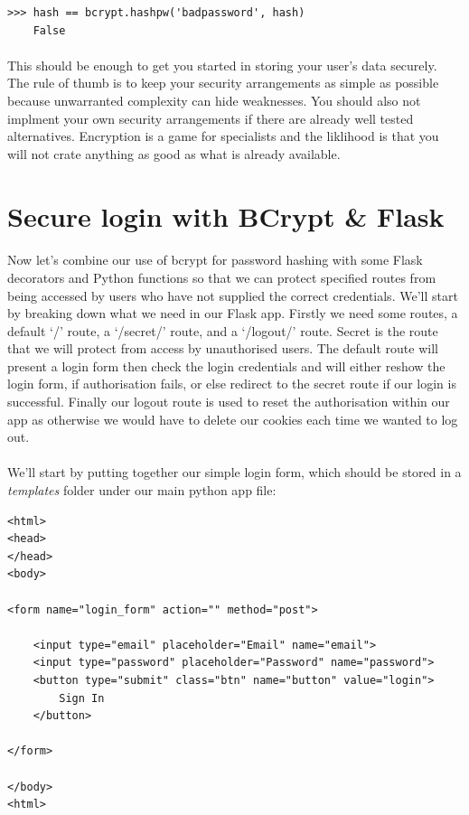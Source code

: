 \documentclass[12pt, a4paper, oneside]{book}
\begin{document}
\begin{lstlisting}[style=DOS]
    >>> hash == bcrypt.hashpw('badpassword', hash)
    False
\end{lstlisting}

\paragraph{} This should be enough to get you started in storing your user's data securely. The rule of thumb is to keep your security arrangements as simple as possible because unwarranted complexity can hide weaknesses. You should also not implment your own security arrangements if there are already well tested alternatives. Encryption is a game for specialists and the liklihood is that you will not crate anything as good as what is already available.


\section{Secure login with BCrypt \& Flask}
\label{login}
\paragraph{} Now let's combine our use of bcrypt for password hashing with some Flask decorators and Python functions so that we can protect specified routes from being accessed by users who have not supplied the correct credentials. We'll start by breaking down what we need in our Flask app. Firstly we need some routes, a default `/' route, a `/secret/' route, and a `/logout/' route. Secret is the route that we will protect from access by unauthorised users. The default route will present a login form then check the login credentials and will either reshow the login form, if authorisation fails, or else redirect to the secret route if our login is successful. Finally our logout route is used to reset the authorisation within our app as otherwise we would have to delete our cookies each time we wanted to log out.

\paragraph{} We'll start by putting together our simple login form, which should be stored in a \emph{templates} folder under our main python app file:

\begin{lstlisting}
<html>
<head>
</head>
<body>

<form name="login_form" action="" method="post">

    <input type="email" placeholder="Email" name="email">
    <input type="password" placeholder="Password" name="password">
    <button type="submit" class="btn" name="button" value="login">
        Sign In
    </button>

</form>

</body>
<html>
\end{lstlisting}
\end{document}
